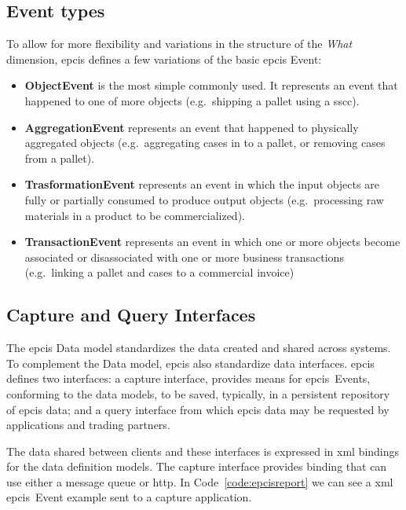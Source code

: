 \subsection{Event types}

To allow for more flexibility and variations in the structure of the \emph{What} dimension, \ac{epcis} defines a few variations of the basic \ac{epcis} Event:

\begin{itemize}
    \item \textbf{ObjectEvent} is the most simple commonly used. It represents an event that happened to one of more objects (e.g.\ shipping a pallet using a \ac{sscc}).
    \item \textbf{AggregationEvent} represents an event that happened to physically aggregated objects (e.g.\ aggregating cases in to a pallet, or removing cases from a pallet).
    \item \textbf{TrasformationEvent} represents an event in which the input objects are fully or partially consumed to produce output objects (e.g.\ processing raw materials in a product to be commercialized).
    \item \textbf{TransactionEvent} represents an event in which one or more objects become associated or disassociated with one or more business transactions (e.g.\ linking a pallet and cases to a commercial invoice)
\end{itemize}

\subsection{Capture and Query Interfaces}

The \ac{epcis} Data model standardizes the data created and shared across systems. 
To complement the Data model, \ac{epcis} also standardize data interfaces.
\ac{epcis} defines two interfaces: a capture interface, provides means for \ac{epcis}~Events, conforming to the data models, to be saved, typically, in a persistent repository of \ac{epcis} data; and a query interface from which \ac{epcis} data may be requested by applications and trading partners.

The data shared between clients and these interfaces is expressed in \ac{xml} bindings for the data definition models.
The capture interface provides binding that can use either a message queue or \ac{http}. In Code~\ref{code:epcisreport} we can see a \ac{xml} \ac{epcis}~Event example sent to a capture application. 

